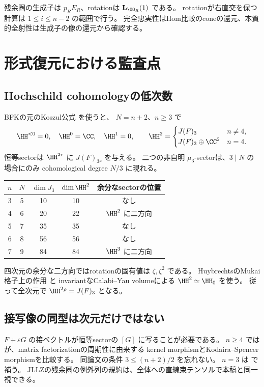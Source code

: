 残余圏の生成子は \(p_RE_R\)、rotationは \(\mathbf L_{\OO_R}(1)\) である。
rotationが右直交を保つ計算は \(1\le i\le n-2\) の範囲で行う。
完全忠実性はHom比較のconeの還元、本質的全射性は生成子の像の還元から確認する。

\section{形式復元における監査点}

\subsection{Hochschild cohomologyの低次数}

BFKの元のKoszul公式 \cite[Theorem 5.39]{BFK} を使うと、
\(N=n+2\)、\(n\ge3\) で
\[
 \HH^{<0}=0,\quad \HH^0=\CC,\quad \HH^1=0,
 \qquad
 \HH^2=
 \begin{cases}J(F)_3&n\ne4,\\J(F)_3\oplus\CC^2&n=4.\end{cases}
\]
恒等sectorは \(\HH^{2r}\) に \(J(F)_{3r}\) を与える。
二つの非自明 \(\mu_3\)-sectorは、\(3\mid N\) の場合にのみ
cohomological degree \(N/3\) に現れる。

\begin{center}
\begin{tabular}{ccccc}
\toprule
\(n\)&\(N\)&\(\dim J_3\)&\(\dim\HH^2\)&余分なsectorの位置\\
\midrule
3&5&10&10&なし\\
4&6&20&22&\(\HH^2\) に二方向\\
5&7&35&35&なし\\
6&8&56&56&なし\\
7&9&84&84&\(\HH^3\) に二方向\\
\bottomrule
\end{tabular}
\end{center}

四次元の余分な二方向ではrotationの固有値は \(\zeta,\zeta^2\) である。
HuybrechtsのMukai格子上の作用 \cite[Proposition 3.12]{Huy} と
invariantなCalabi--Yau volumeによる \(\HH^2\simeq\HH_0\) を使う。
従って全次元で \(\HH^2{}^\rho=J(F)_3\) となる。

\subsection{接写像の同型は次元だけではない}

\(F+\varepsilon G\) の接ベクトルが恒等sectorの \([G]\) に写ることが必要である。
\(n\ge4\) では \cite[Lemma 2.19]{HR} が、matrix factorizationの周期性に由来する
kernel morphismとKodaira--Spencer morphismを比較する。
同論文の条件 \(3\le(n+2)/2\) を忘れない。
\(n=3\) は \cite[Theorem 4.4(2)]{JLLZ} で補う。
JLLZの残余圏の例外列の規約は、全体への直線束テンソルで本稿と同一視できる。

